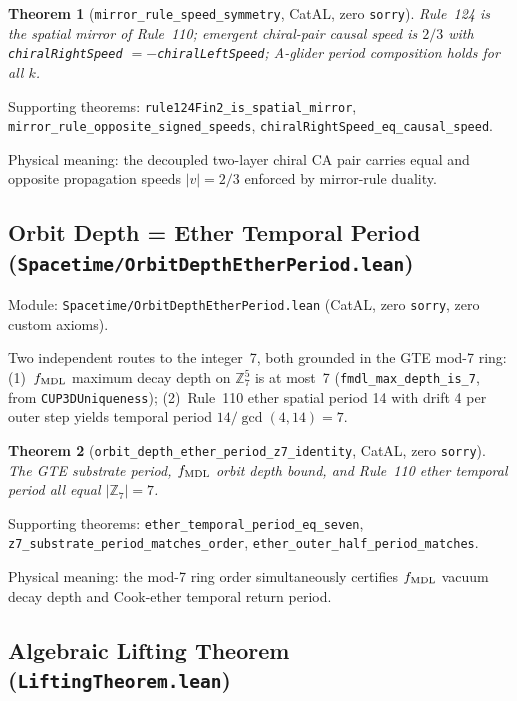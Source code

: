 \documentclass[11pt,a4paper]{article}
\newtheorem{theorem}{Theorem}[section]
\theoremstyle{definition}
\begin{document}
\begin{theorem}[\lstinline|mirror_rule_speed_symmetry|, CatAL, zero \texttt{sorry}]
Rule~124 is the spatial mirror of Rule~110; emergent chiral-pair causal speed
is $2/3$ with \lstinline|chiralRightSpeed| $= -$\lstinline|chiralLeftSpeed|;
A-glider period composition holds for all $k$.
\end{theorem}

\noindent\begingroup\raggedright
Supporting theorems:
\lstinline|rule124Fin2_is_spatial_mirror|,
\lstinline|mirror_rule_opposite_signed_speeds|,
\lstinline|chiralRightSpeed_eq_causal_speed|.
\endgroup

Physical meaning: the decoupled two-layer chiral CA pair carries equal and
opposite propagation speeds $|v| = 2/3$ enforced by mirror-rule duality.

\subsection{Orbit Depth = Ether Temporal Period
  (\texttt{Spacetime/OrbitDepthEtherPeriod.lean})}\label{subsec:orbit-depth-ether}

Module: \texttt{Spacetime/OrbitDepthEtherPeriod.lean} (CatAL,
zero \lstinline|sorry|, zero custom axioms).

Two independent routes to the integer~7, both grounded in the GTE mod-7 ring:
(1)~$f_{\rm MDL}$ maximum decay depth on $\mathbb{Z}_7^5$ is at most~7
(\lstinline|fmdl_max_depth_is_7|, from \texttt{CUP3DUniqueness}); (2)~Rule~110
ether spatial period 14 with drift 4 per outer step yields temporal period
$14/\gcd(4,14) = 7$.

\begin{theorem}[\lstinline|orbit_depth_ether_period_z7_identity|, CatAL, zero \texttt{sorry}]
The GTE substrate period, $f_{\rm MDL}$ orbit depth bound, and Rule~110
ether temporal period all equal $|\mathbb{Z}_7| = 7$.
\end{theorem}

\noindent\begingroup\raggedright
Supporting theorems:
\lstinline|ether_temporal_period_eq_seven|,
\lstinline|z7_substrate_period_matches_order|,
\lstinline|ether_outer_half_period_matches|.
\endgroup

Physical meaning: the mod-7 ring order simultaneously certifies $f_{\rm MDL}$
vacuum decay depth and Cook-ether temporal return period.

\subsection{Algebraic Lifting Theorem
  (\texttt{LiftingTheorem.lean})}\label{subsec:lifting-theorem}
\end{document}
